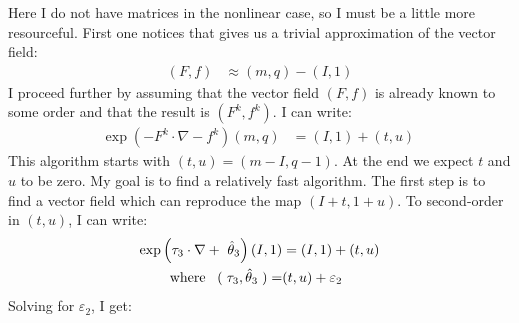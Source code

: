 \documentclass[english,12pt,article]{article} %
\begin{document}
{{{Here I do not have matrices in the nonlinear case, so I must be a little more resourceful. First one notices that     gives us a trivial approximation of the vector field:
%
\begin{align} (F,f)&\approx (m,q)-\left({I,1}\right) \label{expIa1}\end{align}
%
I proceed further by assuming that the vector field $(F,f)$ is already known to some order and that the result is $(F^k,f^k)$. I can write:
%
\begin{align} \exp\left({-{F}^{k}\cdot \nabla -{f}^{k}}\right)\left({m,q}\right)&=\left({I,1}\right) + \left({t,u}\right)\ \label{kint} \end{align}
%
%
This algorithm starts with $(t,u)=(m-I,q-1)$. At the end we expect $t$ and $u$ to be zero. My goal is to find a relatively fast algorithm. The first step is to find a vector field which can reproduce the map $(I+t,1+u)$. To second-order in $(t,u)$, I can write:
%
\begin{align} \exp\left({{\tau }_{3}\cdot \nabla +\ {\hat{\theta }}_{3}}\right) (I,1)&= (I,1)+(t,u)\label{eqfort} \\ {\rm w}{\rm h}{\rm e}{\rm r}{\rm e}~~\left({\vphantom{\Delta }}\right.{\tau }_{3},{\hat{\theta }}_{3}\left.{\vphantom{\Delta }}\right) =&(t,u)+{\varepsilon }_{2}\nonumber 
\end{align}
%
Solving for ${\varepsilon }_{2}$, I get:
%
}}}
\end{document}
